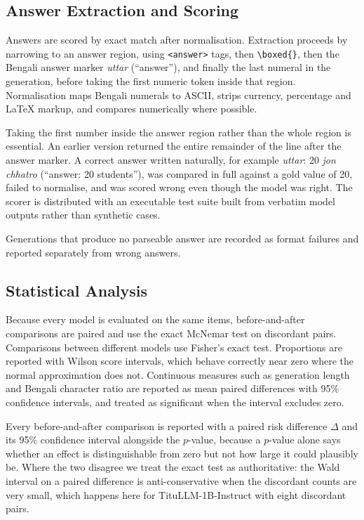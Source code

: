 \documentclass[10pt,twocolumn,letterpaper]{article}
\begin{document}
\subsection{Answer Extraction and Scoring}

Answers are scored by exact match after normalisation. Extraction proceeds by
narrowing to an answer region, using \texttt{<answer>} tags, then
\texttt{\textbackslash boxed\{\}}, then the Bengali answer marker \emph{uttar}
(``answer''), and finally the last numeral in the generation, before taking the
first numeric token inside that region. Normalisation maps Bengali numerals
to ASCII, strips currency, percentage and LaTeX markup, and compares numerically
where possible.

Taking the first number inside the answer region rather than the whole region is
essential. An earlier version returned the entire remainder of the line after
the answer marker. A correct answer written naturally, for example
\emph{uttar}: 20 \emph{jon chhatro} (``answer: 20 students''), was compared in
full against a gold value of 20, failed to normalise, and was scored wrong even
though the model was right. The scorer is distributed with an executable
test suite built from verbatim model outputs rather than synthetic cases.

Generations that produce no parseable answer are recorded as format failures and
reported separately from wrong answers.

\subsection{Statistical Analysis}

Because every model is evaluated on the same items, before-and-after comparisons
are paired and use the exact McNemar test on discordant pairs. Comparisons
between different models use Fisher's exact test. Proportions are reported with
Wilson score intervals, which behave correctly near zero where the normal
approximation does not. Continuous measures such as generation length and
Bengali character ratio are reported as mean paired differences with 95\%
confidence intervals, and treated as significant when the interval excludes
zero.

Every before-and-after comparison is reported with a paired risk difference
$\Delta$ and its 95\% confidence interval alongside the $p$-value, because a
$p$-value alone says whether an effect is distinguishable from zero but not how
large it could plausibly be. Where the two disagree we treat the exact test as
authoritative: the Wald interval on a paired difference is anti-conservative
when the discordant counts are very small, which happens here for
TituLLM-1B-Instruct with eight discordant pairs.
\end{document}
